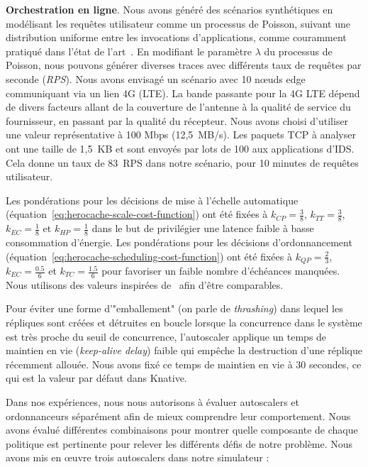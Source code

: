 {\textbf{Orchestration en ligne}. Nous avons généré des scénarios synthétiques en modélisant les requêtes utilisateur comme un processus de Poisson, suivant une distribution uniforme entre les invocations d'applications, comme couramment pratiqué dans l'état de l'art~\cite{9928755}. En modifiant le paramètre $\lambda$ du processus de Poisson, nous pouvons générer diverses traces avec différents taux de requêtes par seconde (\textit{RPS}). Nous avons envisagé un scénario avec 10 nœuds edge communiquant via un lien 4G (LTE). La bande passante pour la 4G LTE dépend de divers facteurs allant de la couverture de l'antenne à la qualité de service du fournisseur, en passant par la qualité du récepteur. Nous avons choisi d'utiliser une valeur représentative à 100 Mbps (12,5~MB/s). Les paquets \gls{TCP} à analyser ont une taille de 1,5~KB et sont envoyés par lots de 100 aux applications d'IDS. Cela donne un taux de 83~RPS dans notre scénario, pour 10 minutes de requêtes utilisateur.

Les pondérations pour les décisions de mise à l'échelle automatique (équation~\ref{eq:herocache-scale-cost-function}) ont été fixées à $k_{CP} = \frac{3}{8}$, $k_{TT} = \frac{3}{8}$, $k_{EC} = \frac{1}{8}$ et $k_{HP} = \frac{1}{8}$ dans le but de privilégier une latence faible à basse consommation d'énergie. Les pondérations pour les décisions d'ordonnancement (équation~\ref{eq:herocache-scheduling-cost-function}) ont été fixées à $k_{QP} = \frac{2}{3}$, $k_{EC} = \frac{0.5}{6}$ et $k_{TC} = \frac{1.5}{6}$ pour favoriser un faible nombre d'échéances manquées. Nous utilisons des valeurs inspirées de~\cite{herofake} afin d'être comparables.

Pour éviter une forme d'"emballement" (on parle de \textit{thrashing}) dans lequel les répliques sont créées et détruites en boucle lorsque la concurrence dans le système est très proche du seuil de concurrence, l'autoscaler applique un temps de maintien en vie (\textit{keep-alive delay}) faible qui empêche la destruction d'une réplique récemment allouée. Nous avons fixé ce temps de maintien en vie à 30 secondes, ce qui est la valeur par défaut dans Knative.

Dans nos expériences, nous nous autorisons à évaluer autoscalers et ordonnanceurs séparément afin de mieux comprendre leur comportement. Nous avons évalué différentes combinaisons pour montrer quelle composante de chaque politique est pertinente pour relever les différents défis de notre problème. Nous avons mis en œuvre trois autoscalers dans notre simulateur :

}

